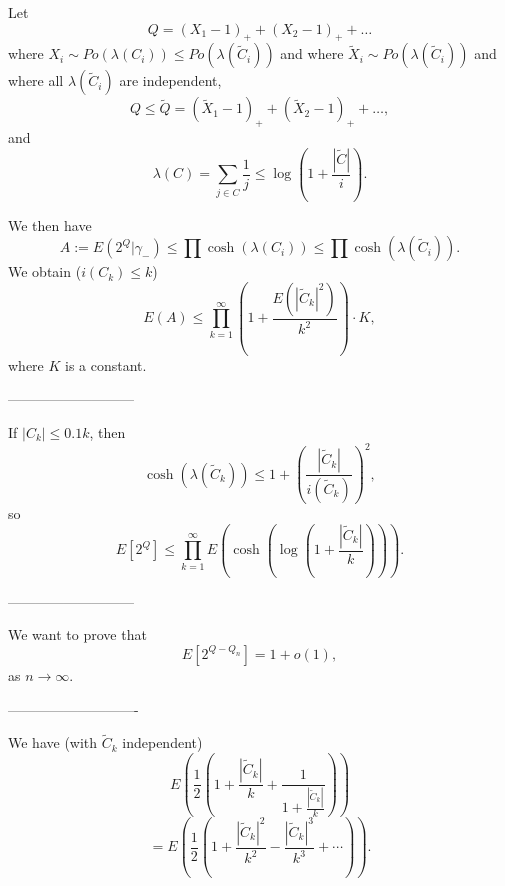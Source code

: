 \documentclass[11pt, oneside]{article}   	%
\begin{document}
Let 
$$Q=(X_1 -1)_+ +(X_2-1)_+ +\ldots$$
where $X_i \sim Po(\lambda(C_i))\leq Po(\lambda(\tilde C_i))$ and where $\tilde X_i \sim Po(\lambda(\tilde C_i))$ and where all 
$\lambda(\tilde C_i)$ are independent, 
$$Q\leq \tilde Q =(\tilde X_1-1)_+ +(\tilde X_2-1 )_+ +\ldots,$$
and
$$\lambda(C)=\sum_{j\in C} \frac{1}{j}\leq \log \left(1+\frac{|\tilde C|}{i}\right).$$

We then have 
$$A:=E(2^Q | \gamma_- )\leq \prod \cosh (\lambda(C_i))\leq \prod \cosh (\lambda (\tilde C_i)).$$
We obtain ($i(C_k)\leq k$)
$$E(A)\leq \prod_{k=1}^\infty \left(1+\frac{E(|\tilde C_k|^2)}{k^2}\right)\cdot K,$$
where $K$ is a constant.

---------------------------

If $|C_k|\leq 0.1 k$, then 
$$\cosh (\lambda (\tilde C_k))\leq 1+\left( \frac{|\tilde C_k|}{i(\tilde C_k)}\right)^2,$$
so
$$E[2^Q]\leq \prod_{k=1}^\infty E \left(\cosh \left(\log \left(1+\frac{|\tilde C_k |}{k} \right) \right) \right).$$

---------------------------

We want to prove that 
$$E[2^{Q-Q_n}]=1+o(1),$$
as $n\to \infty$.

----------------------------

We have (with $\tilde C_k$ independent)
$$E\left(\frac{1}{2}(1+\frac{|\tilde C_k|}{k}+\frac{1}{1+\frac{|\tilde C_k|}{k}}) \right)$$
$$=E\left(\frac{1}{2}(1+\frac{|\tilde C_k|^2}{k^2}-\frac{|\tilde C_k|^3}{k^3}+\cdots )\right).$$
\end{document}
